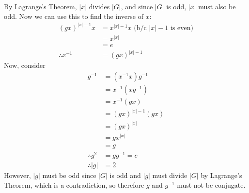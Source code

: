\documentclass[fleqn]{article}
\begin{document}
        By Lagrange's Theorem, $|x|$ divides $|G|$, and since $|G|$ is odd, $|x|$ must also be odd.
        Now we can use this to find the inverse of $x$:
        \begin{align}
            (gx)^{|x| - 1}x &= x^{|x| - 1} x \text{ (b/c $|x| - 1$ is even)} \\
                &= x^{|x|} \\
                &= e \\
            \therefore x^{-1} &= (gx)^{|x| - 1}
        \end{align}
        Now, consider
        \begin{align}
            g^{-1} &= (x^{-1}x)g^{-1} \\
                &= x^{-1}(xg^{-1}) \\
                &= x^{-1} (gx) \\
                &= (gx)^{|x| - 1}(gx) \\
                &= (gx)^{|x|} \\
                &= gx^{|x|} \\
                &= g \\
            \therefore g^2 &= gg^{-1} = e \\
            \therefore |g| &= 2
        \end{align}
        However, $|g|$ must be odd since $|G|$ is odd and $|g|$ must divide $|G|$ by Lagrange's Theorem, which is a contradiction, so therefore $g$ and $g^{-1}$ must not be conjugate.
    
\end{document}
